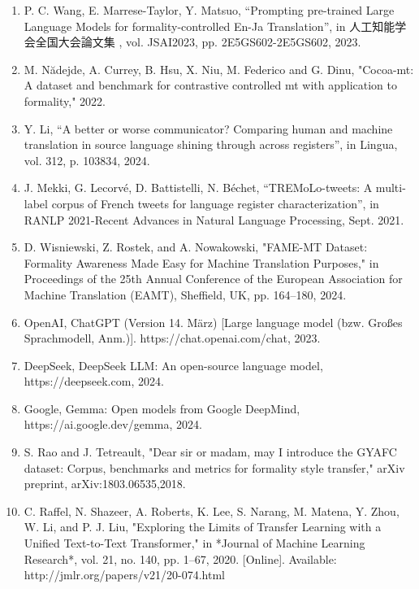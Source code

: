 \documentclass[fleqn,moreauthors,10pt]{ds_report}
\begin{document}
		
		
		\renewcommand{\labelenumi}{[\theenumi]}
		\begin{CJK*}
		\begin{enumerate}
			\item  P. C. Wang, E. Marrese-Taylor, Y. Matsuo, “Prompting pre-trained Large Language Models for formality-controlled En-Ja Translation”, in 人工知能学会全国大会論文集 , vol. JSAI2023, pp. 2E5GS602-2E5GS602, 2023.
			\item M. N\u{a}dejde, A. Currey, B. Hsu, X. Niu, M. Federico and G. Dinu, "Cocoa-mt: A dataset and benchmark for contrastive controlled mt with application to formality," 2022.
			\item Y. Li, “A better or worse communicator? Comparing human and machine translation in source language shining through across registers”, in Lingua, vol. 312, p. 103834, 2024.
			\item J. Mekki, G. Lecorvé, D. Battistelli, N. Béchet, “TREMoLo-tweets: A multi-label corpus of French tweets for language register characterization”, in RANLP 2021-Recent Advances in Natural Language Processing, Sept. 2021.
			\item D. Wisniewski, Z. Rostek, and A. Nowakowski, "FAME-MT Dataset: Formality Awareness Made Easy for Machine Translation Purposes," in Proceedings of the 25th Annual Conference of the European Association for Machine Translation (EAMT), Sheffield, UK, pp. 164–180, 2024.
			\item OpenAI, ChatGPT (Version 14. März) [Large language model (bzw. Großes Sprachmodell, Anm.)]. https://chat.openai.com/chat, 2023.
			\item DeepSeek, DeepSeek LLM: An open-source language model, https://deepseek.com, 2024.
			\item Google, Gemma: Open models from Google DeepMind, https://ai.google.dev/gemma, 2024.
			\item S. Rao and J. Tetreault, "Dear sir or madam, may I introduce the GYAFC dataset: Corpus, benchmarks and metrics for formality style transfer," arXiv preprint, arXiv:1803.06535,2018.
			\item C. Raffel, N. Shazeer, A. Roberts, K. Lee, S. Narang, M. Matena, Y. Zhou, W. Li, and P. J. Liu, "Exploring the Limits of Transfer Learning with a Unified Text-to-Text Transformer," in *Journal of Machine Learning Research*, vol. 21, no. 140, pp. 1–67, 2020. [Online]. Available: http://jmlr.org/papers/v21/20-074.html
		\end{enumerate}
	\end{CJK*}
		
	
\end{document}
